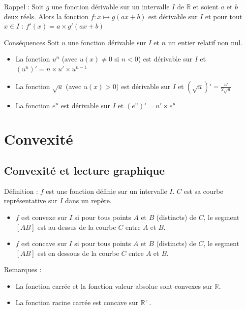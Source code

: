 \documentclass[11pt,a4paper]{article}
\begin{document}
\begin{boiteRappel}{Rappel :}
    Soit $g$ une fonction dérivable sur un intervalle $I$ de $\mathbb{R}$ et soient $a$ et $b$ deux réels. Alors la fonction $f:x \mapsto g(ax + b)$ est dérivable sur $I$ et pour tout $x \in I$ : $f'(x) = a \times g'(ax + b)$
\end{boiteRappel}

\begin{boiteProp}{Conséquences}
    Soit $u$ une fonction dérivable sur $I$ et $n$ un entier relatif non nul.
    \begin{itemize}
         \item La fonction $u^n$ (avec $u(x) \neq 0$ si $n < 0$) est dérivable sur $I$ et $(u^n)'= n \times u' \times u^{n-1}$
         \item La fonction $\sqrt{u}$ (avec $u(x) > 0$) est dérivable sur $I$ et $(\sqrt{u})' = \frac{u'}{2 \sqrt{u}}$
         \item La fonction $e^u$ est dérivable sur $I$ et $(e^u)' = u' \times e^{u}$
    \end{itemize}
\end{boiteProp}

\section{Convexité}

\subsection{Convexité et lecture graphique}

\begin{boiteDef}{Définition :}
    $f$ est une fonction définie sur un intervalle $I$. 
    \newline
    $C$ est sa courbe représentative sur $I$ dans un repère.
    \newline
    \begin{itemize}
        \item $f$ est convexe sur $I$ si pour tous points $A$ et $B$ (distincts) de $C$, le segment $[AB]$ est au-dessus de la courbe $C$ entre $A$ et $B$.
        \item $f$ est concave sur $I$ si pour tous points $A$ et $B$ (distincts) de $C$, le segment $[AB]$ est en dessous de la courbe $C$ entre $A$ et $B$.
    \end{itemize}
\end{boiteDef}

\begin{boiteRemarque}{Remarques :}
    \begin{itemize}
        \item La fonction carrée et la fonction valeur absolue sont convexes sur $\mathbb{R}$.
        \item La fonction racine carrée est concave sur $\mathbb{R}^+$.
    \end{itemize}
\end{boiteRemarque}
\end{document}
